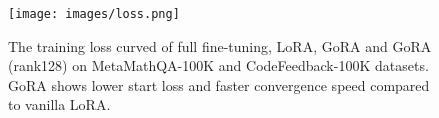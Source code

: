 \begin{figure}[ht!] 
    \centering \texttt{[image: images/loss.png]}
    \caption{The training loss curved of full fine-tuning, LoRA, GoRA and GoRA (rank128) on MetaMathQA-100K and CodeFeedback-100K datasets. GoRA shows lower start loss and faster convergence speed compared to vanilla LoRA.}
    \label{fig:loss}
\end{figure}